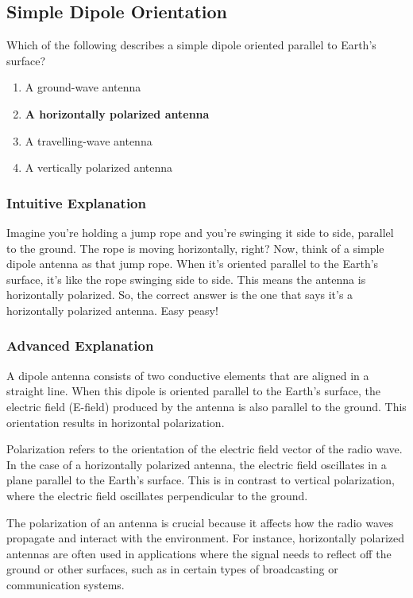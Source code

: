 \subsection{Simple Dipole Orientation}
\label{T9A03}

\begin{tcolorbox}[colback=gray!10!white,colframe=black!75!black,title=T9A03]
Which of the following describes a simple dipole oriented parallel to Earth's surface?
\begin{enumerate}[label=\Alph*]
    \item A ground-wave antenna
    \item \textbf{A horizontally polarized antenna}
    \item A travelling-wave antenna
    \item A vertically polarized antenna
\end{enumerate}
\end{tcolorbox}

\subsubsection{Intuitive Explanation}
Imagine you’re holding a jump rope and you’re swinging it side to side, parallel to the ground. The rope is moving horizontally, right? Now, think of a simple dipole antenna as that jump rope. When it’s oriented parallel to the Earth’s surface, it’s like the rope swinging side to side. This means the antenna is horizontally polarized. So, the correct answer is the one that says it’s a horizontally polarized antenna. Easy peasy!

\subsubsection{Advanced Explanation}
A dipole antenna consists of two conductive elements that are aligned in a straight line. When this dipole is oriented parallel to the Earth's surface, the electric field (E-field) produced by the antenna is also parallel to the ground. This orientation results in horizontal polarization. 

Polarization refers to the orientation of the electric field vector of the radio wave. In the case of a horizontally polarized antenna, the electric field oscillates in a plane parallel to the Earth's surface. This is in contrast to vertical polarization, where the electric field oscillates perpendicular to the ground.

The polarization of an antenna is crucial because it affects how the radio waves propagate and interact with the environment. For instance, horizontally polarized antennas are often used in applications where the signal needs to reflect off the ground or other surfaces, such as in certain types of broadcasting or communication systems.

